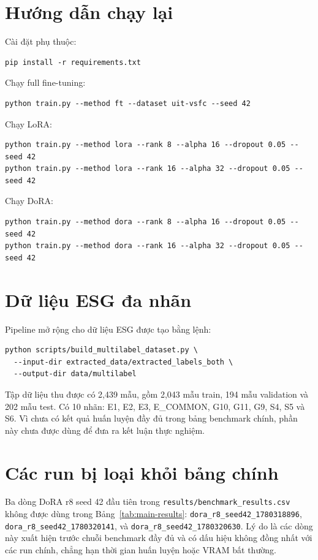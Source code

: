 \documentclass{article}
\theoremstyle{plain}
\theoremstyle{definition}
\begin{document}



\newpage
\appendix
\onecolumn

\section{Hướng dẫn chạy lại}

Cài đặt phụ thuộc:
\begin{verbatim}
pip install -r requirements.txt
\end{verbatim}

Chạy full fine-tuning:
\begin{verbatim}
python train.py --method ft --dataset uit-vsfc --seed 42
\end{verbatim}

Chạy LoRA:
\begin{verbatim}
python train.py --method lora --rank 8 --alpha 16 --dropout 0.05 --seed 42
python train.py --method lora --rank 16 --alpha 32 --dropout 0.05 --seed 42
\end{verbatim}

Chạy DoRA:
\begin{verbatim}
python train.py --method dora --rank 8 --alpha 16 --dropout 0.05 --seed 42
python train.py --method dora --rank 16 --alpha 32 --dropout 0.05 --seed 42
\end{verbatim}

\section{Dữ liệu ESG đa nhãn}

Pipeline mở rộng cho dữ liệu ESG được tạo bằng lệnh:
\begin{verbatim}
python scripts/build_multilabel_dataset.py \
  --input-dir extracted_data/extracted_labels_both \
  --output-dir data/multilabel
\end{verbatim}

Tập dữ liệu thu được có 2,439 mẫu, gồm 2,043 mẫu train, 194 mẫu validation và 202 mẫu test. Có 10 nhãn: E1, E2, E3, E\_COMMON, G10, G11, G9, S4, S5 và S6. Vì chưa có kết quả huấn luyện đầy đủ trong bảng benchmark chính, phần này chưa được dùng để đưa ra kết luận thực nghiệm.

\section{Các run bị loại khỏi bảng chính}

Ba dòng DoRA r8 seed 42 đầu tiên trong \texttt{results/benchmark\_results.csv} không được dùng trong Bảng~\ref{tab:main-results}: \texttt{dora\_r8\_seed42\_1780318896}, \texttt{dora\_r8\_seed42\_1780320141}, và \texttt{dora\_r8\_seed42\_1780320630}. Lý do là các dòng này xuất hiện trước chuỗi benchmark đầy đủ và có dấu hiệu không đồng nhất với các run chính, chẳng hạn thời gian huấn luyện hoặc VRAM bất thường.
\end{document}
